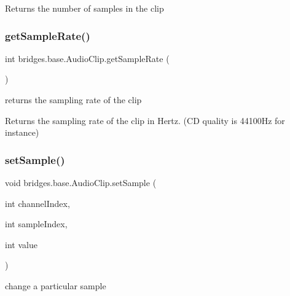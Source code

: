 \begin{DoxyReturn}{Returns}
the number of samples in the clip 
\end{DoxyReturn}
\mbox{\label{classbridges_1_1base_1_1_audio_clip_a610df43929946a6186e6739e361916eb}} 
\subsubsection{\texorpdfstring{get\+Sample\+Rate()}{getSampleRate()}}
{\footnotesize\ttfamily int bridges.\+base.\+Audio\+Clip.\+get\+Sample\+Rate (\begin{DoxyParamCaption}{ }\end{DoxyParamCaption})}



returns the sampling rate of the clip 

\begin{DoxyReturn}{Returns}
the sampling rate of the clip in Hertz. (CD quality is 44100\+Hz for instance) 
\end{DoxyReturn}
\mbox{\label{classbridges_1_1base_1_1_audio_clip_a896e82f2788b319569c4f0e8f919ffc9}} 
\subsubsection{\texorpdfstring{set\+Sample()}{setSample()}}
{\footnotesize\ttfamily void bridges.\+base.\+Audio\+Clip.\+set\+Sample (\begin{DoxyParamCaption}\item[{int}]{channel\+Index,  }\item[{int}]{sample\+Index,  }\item[{int}]{value }\end{DoxyParamCaption})}



change a particular sample 



